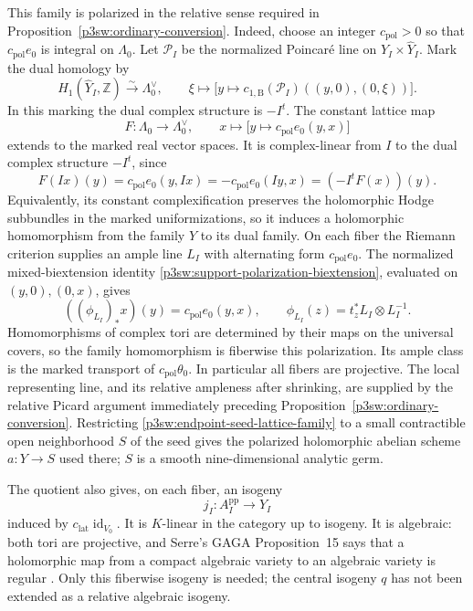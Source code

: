 \documentclass[11pt]{article}
\newcommand{\Z}{\mathbb Z}
\numberwithin{equation}{section}
\begin{document}
This family is polarized in the relative sense required in
Proposition~\ref{p3sw:ordinary-conversion}.  Indeed, choose an integer
\(c_{\mathrm{pol}}>0\) so that \(c_{\mathrm{pol}}e_0\) is integral
on \(\Lambda_0\).  Let \(\mathcal P_I\) be the normalized Poincar\'e
line on \(Y_I\times\widehat Y_I\).  Mark the dual homology by
\[
 H_1(\widehat Y_I,\Z)\xrightarrow{\sim}\Lambda_0^\vee,\qquad
 \xi\longmapsto\bigl[y\longmapsto
 c_{1,\mathrm B}(\mathcal P_I)((y,0),(0,\xi))\bigr].
\]
In this marking the dual complex structure is \(-I^t\).  The constant
lattice map
\[
 F:\Lambda_0\longrightarrow\Lambda_0^\vee,\qquad
 x\longmapsto\bigl[y\longmapsto c_{\mathrm{pol}}e_0(y,x)\bigr]
\]
extends to the marked real vector spaces.  It is complex-linear from
\(I\) to the dual complex structure \(-I^t\), since
\[
 F(Ix)(y)=c_{\mathrm{pol}}e_0(y,Ix)
   =-c_{\mathrm{pol}}e_0(Iy,x)=(-I^tF(x))(y).
\]
Equivalently, its constant
complexification preserves the holomorphic Hodge subbundles in the
marked uniformizations, so it induces a holomorphic homomorphism
from the family \(Y\) to its dual family.  On each fiber the Riemann
criterion supplies an ample line \(L_I\) with alternating form
\(c_{\mathrm{pol}}e_0\).  The normalized mixed-biextension identity
\eqref{p3sw:support-polarization-biextension}, evaluated on
\((y,0),(0,x)\), gives
\[
 ((\phi_{L_I})_*x)(y)=c_{\mathrm{pol}}e_0(y,x),\qquad
 \phi_{L_I}(z)=t_z^*L_I\otimes L_I^{-1}.
\]
Homomorphisms of complex tori are determined by their maps on the
universal covers, so the family homomorphism is fiberwise this
polarization.  Its ample class is the marked transport of
\(c_{\mathrm{pol}}\theta_0\).  In particular all fibers are projective.
The local representing line, and its relative ampleness after
shrinking, are supplied by the relative Picard argument immediately
preceding Proposition~\ref{p3sw:ordinary-conversion}.  Restricting
\eqref{p3sw:endpoint-seed-lattice-family} to a small contractible
open neighborhood \(S\) of the seed gives the polarized
holomorphic abelian scheme \(a:Y\to S\) used there; \(S\) is a
smooth nine-dimensional analytic germ.

The quotient also gives, on each fiber, an isogeny
\begin{equation}
\label{p3sw:endpoint-reference-isogeny}
 j_I:A_I^{\mathrm{pp}}\longrightarrow Y_I
\end{equation}
induced by \(c_{\mathrm{lat}}\operatorname{id}_{V_0}\).  It is
\(K\)-linear in the category up to isogeny.  It is algebraic:
both tori are projective, and Serre's GAGA Proposition~15 says that
a holomorphic map from a compact algebraic variety to an algebraic
variety is regular
\cite[Section~4, no.~19, Proposition~15, pp.~29--30]{P3SWSerreGAGA1956}.
Only this fiberwise isogeny is needed; the central isogeny \(q\)
has not been extended as a relative algebraic isogeny.
\end{document}

